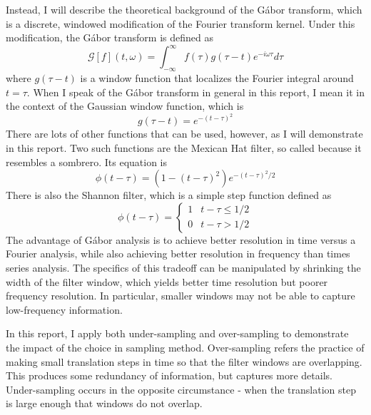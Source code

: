 \documentclass[a4paper,10 pt]{article}
\begin{document}
Instead, I will describe the theoretical background of the G\'abor transform, which is a discrete, windowed modification of the Fourier transform kernel. Under this modification, the G\'abor transform is defined as 
\begin{equation}
    \mathcal{G}[f](t,\omega)=\int_{-\infty}^\infty f(\tau)g(\tau-t)e^{-i\omega\tau}d\tau
\end{equation}
where $g(\tau-t)$ is a window function that localizes the Fourier integral around $t=\tau$. When I speak of the G\'abor transform in general in this report, I mean it in the context of the Gaussian window function, which is
\begin{equation}
    g(\tau-t)=e^{-(t-\tau)^2}
\end{equation}
There are lots of other functions that can be used, however, as I will demonstrate in this report. Two such functions are the Mexican Hat filter, so called because it resembles a sombrero. Its equation is
\begin{equation}
    \phi(t-\tau)=(1-(t-\tau)^2)e^{-(t-\tau)^2/2}
\end{equation}
There is also the Shannon filter, which is a simple step function defined as
\begin{equation}
    \phi(t-\tau)=\begin{cases}1 & t-\tau \leq 1/2 \\ 0 & t-\tau > 1/2\end{cases}
\end{equation}
The advantage of G\'abor analysis is to achieve better resolution in time versus a Fourier analysis, while also achieving better resolution in frequency than times series analysis. The specifics of this tradeoff can be manipulated by shrinking the width of the filter window, which yields better time resolution but poorer frequency resolution. In particular, smaller windows may not be able to capture low-frequency information.

In this report, I apply both under-sampling and over-sampling to demonstrate the impact of the choice in sampling method. Over-sampling refers the practice of making small translation steps in time so that the filter windows are overlapping. This produces some redundancy of information, but captures more details. Under-sampling occurs in the opposite circumstance - when the translation step is large enough that windows do not overlap.
\end{document}
